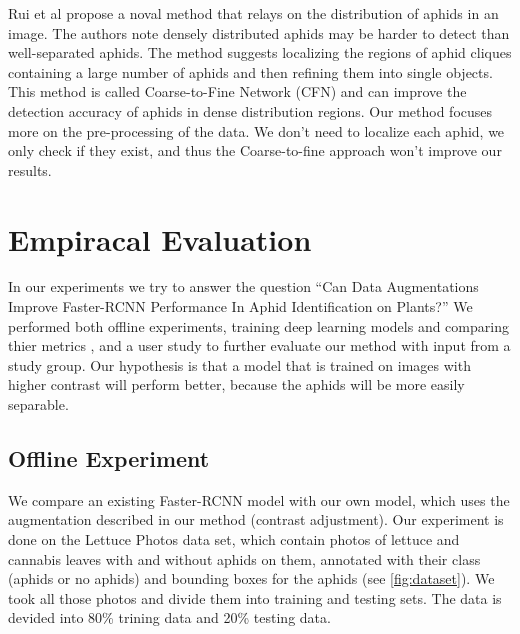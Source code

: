 \documentclass{article}
\begin{document}
Rui et al \cite{CoarseToFine} propose a noval method that relays on the distribution of aphids in an image. 
The authors note densely distributed aphids may be harder to detect than well-separated aphids. 
The method suggests localizing the regions of aphid cliques containing a large number of 
aphids and then refining them into single objects. This method is called 
Coarse-to-Fine Network (CFN) and can improve the detection accuracy of aphids in dense 
distribution regions. Our method focuses more on the pre-processing of the data. 
We don't need to localize each aphid, we only check if they exist, and thus the Coarse-to-fine 
approach won't improve our results.

\section{Empiracal Evaluation}
In our experiments we try to answer the question “Can Data Augmentations Improve Faster-RCNN Performance In Aphid Identification on Plants?”
We performed both offline experiments, training deep learning models and comparing thier metrics
, and a user study to further evaluate our method with input from a study group.
Our hypothesis is that a model that is trained on images with higher contrast will perform better,
because the aphids will be more easily separable.

\subsection{Offline Experiment}
We compare an existing Faster-RCNN model with our own model, which uses the augmentation described in our method (contrast adjustment).
Our experiment is done on the Lettuce Photos data set, which contain photos of lettuce and cannabis leaves with and without aphids on them, 
annotated with their class (aphids or no aphids) and bounding boxes for the aphids (see \ref{fig:dataset}).
We took all those photos and divide them into training and testing sets. The data is devided into 80\% trining data and 
20\% testing data.
\end{document}
